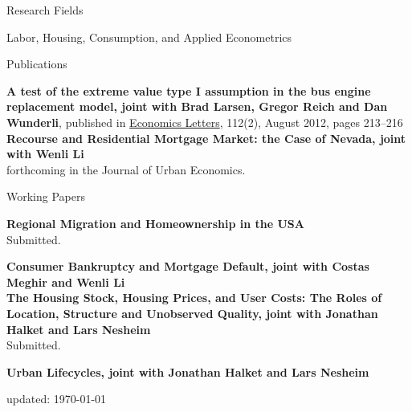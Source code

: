 \documentclass{cvjobmarket} %
\begin{document}
\begin{rSection}{Research Fields}

{Labor, Housing, Consumption, and Applied Econometrics}\\ 

\end{rSection}




\begin{rSection}{Publications}

{\textbf{A test of the extreme value type I assumption in the bus engine replacement model, joint with Brad Larsen, Gregor Reich and Dan Wunderli}, published in \href{http://www.sciencedirect.com/science/article/pii/S0165176512000870}{Economics Letters}, 112(2), August 2012, pages 213--216}\\ 


{\textbf{Recourse and Residential Mortgage Market: the Case of Nevada, joint with Wenli Li}} \\
{forthcoming in the Journal of Urban Economics.}

\end{rSection}

\begin{rSection}{Working Papers}

{\textbf{Regional Migration and Homeownership in the USA}}\\
{Submitted.}

{\textbf{Consumer Bankruptcy and Mortgage Default, joint with Costas Meghir and Wenli Li}} \\


{\textbf{The Housing Stock, Housing Prices, and User Costs: The Roles of Location, Structure and Unobserved Quality, joint with Jonathan Halket and Lars Nesheim}} \\
{Submitted.}

{\textbf{Urban Lifecycles, joint with Jonathan Halket and Lars Nesheim}} \\

\end{rSection}


updated: \today
\end{document}
